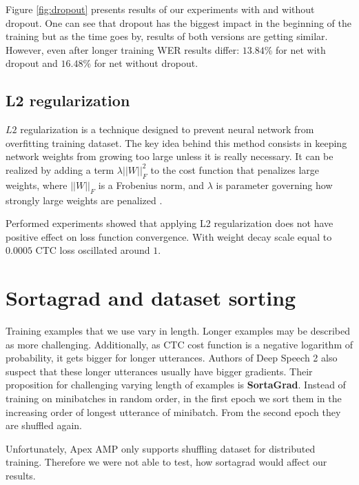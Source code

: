 \documentclass[licencjacka,en]{pracamgr}
\begin{document}
	Figure \ref{fig:dropout} presents results of our experiments with and without dropout. One can see that dropout has the biggest impact in the beginning of the training but as the time goes by, results of both versions are getting similar. However, even after longer training WER results differ: $13.84$\% for net with dropout and $16.48$\% for net without dropout.
	
	
	\subsection{L2 regularization}
	$L2$ regularization is a technique designed to prevent neural network from overfitting training dataset. The key idea behind this method consists in keeping network weights from growing too large unless it is really necessary. It can be realized by adding a term $\lambda ||W||^2_F $ to the cost function that penalizes large weights, where $||W||_F $ is
	a Frobenius norm, and $\lambda$ is parameter governing how strongly large weights are penalized \cite{L2}.
	
	Performed experiments showed that applying L2 regularization does not have positive effect on loss function convergence. With weight decay scale equal to $0.0005$ CTC loss oscillated around $1$.
	
	
	

	
	
	\section{Sortagrad and dataset sorting}
	Training examples that we use vary in length. Longer examples may be described as more challenging. Additionally, as CTC cost function is a negative logarithm of probability, it gets bigger for longer utterances. Authors of Deep Speech 2 also suspect that these longer utterances usually have bigger gradients. Their proposition for challenging varying length of examples is \textbf{SortaGrad}. Instead of training on minibatches in random order, in the first epoch we sort them in the increasing order of longest utterance of minibatch. From the second epoch they are shuffled again.
	
	Unfortunately, Apex AMP only supports shuffling dataset for distributed training. Therefore we were not able to test, how sortagrad would affect our results.
	
\end{document}
